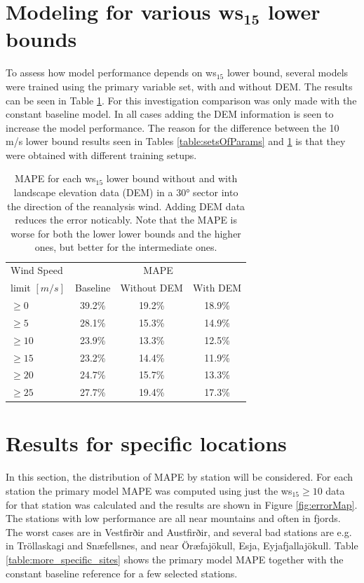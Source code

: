 \section{Modeling for various ws$_\textbf{15}$ lower bounds}
To assess how model performance depends on ws$_{15}$ lower bound, several models were trained using the primary variable set, with and without DEM. The results can be seen in Table \ref{table:results}. For this investigation comparison was only made with the constant baseline model. In all cases adding the DEM information is seen to increase the model performance. The reason for the difference between the 10 m/s lower bound results seen in Tables \ref{table:setsOfParams} and \ref{table:results} is that they were obtained with different training setups. 

\begin{table}[h]
  \caption[Model results for different wind speed limits]{MAPE for each ws$_{15}$ lower bound without and with landscape elevation data (DEM) in a 30° sector into the direction of the reanalysis wind. Adding DEM data reduces the error noticably. Note that the MAPE is worse for both the lower lower bounds and the higher ones, but better for the intermediate ones.}
    \label{table:results}
    \centering
    \begin{tabular}{lccc}
        \toprule
        Wind Speed & \multicolumn{3}{c}{MAPE} \\
        limit $[m/s]$ & Baseline & Without DEM & With DEM \\
        \midrule
        $\geq 0$ & 39.2\% & 19.2\% & 18.9\% \\
        $\geq 5$ & 28.1\% & 15.3\% & 14.9\%\\
        $\geq 10$ & 23.9\% & 13.3\% & 12.5\%\\
        $\geq 15$ & 23.2\% & 14.4\% & 11.9\%\\
        $\geq 20$ & 24.7\% & 15.7\% & 13.3\%\\
        $\geq 25$ & 27.7\% & 19.4\% & 17.3\%\\
        \bottomrule
    \end{tabular}
  \end{table}

\section{Results for specific locations}
In this section, the distribution of MAPE by station will be considered. For each station the primary model MAPE was computed using just the ws$_{15} \geq 10$ data for that station was calculated and the results are shown in Figure \ref{fig:errorMap}. The stations with low performance are all near mountains and often in fjords. The worst cases are in Vestfirðir and Austfirðir, and several bad stations are e.g. in Tröllaskagi and Snæfellsnes, and near Öræfajökull, Esja, Eyjafjallajökull. Table \ref{table:more_specific_sites} shows the primary model MAPE together with the constant baseline reference for a few selected stations.

